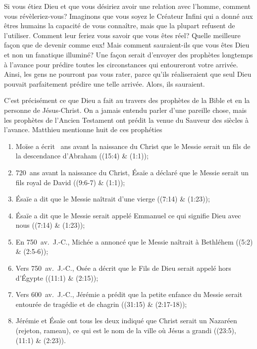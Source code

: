 

Si vous étiez Dieu et que vous désiriez avoir une relation avec l'homme, comment vous révèleriez-vous? Imaginons que vous soyez le Créateur Infini qui a donné aux êtres humains la capacité de vous connaître, mais que la plupart refusent de l'utiliser. Comment leur feriez vous savoir que vous êtes réel? Quelle meilleure façon que de devenir comme eux! Mais comment sauraient-ils que vous êtes Dieu et non un fanatique illuminé? Une façon serait d'envoyer des prophètes longtemps à l'avance pour prédire toutes les circonstances qui entoureront votre arrivée. Ainsi, les gens ne pourront pas vous rater, parce qu'ils réaliseraient que seul Dieu pouvait parfaitement prédire une telle arrivée. Alors, ils sauraient.

C'est précisément ce que Dieu a fait au travers des prophètes de la Bible et en la personne de Jésus-Christ. On a jamais entendu parler d'une pareille chose, mais les prophètes de l'Ancien Testament ont prédit la venue du Sauveur des siècles à l'avance. Matthieu mentionne huit de ces prophéties\frcolon{}

\begin{enumerate}
        \item Moïse a écrit ~ans avant la naissance du Christ que le Messie serait un fils de la descendance d'Abraham ((15:4) \& (1:1));
        \item 720~ans avant la naissance du Christ, Ésaïe a déclaré que le Messie serait un fils royal de David ((9:6-7) \& (1:1));
        \item Ésaïe a dit que le Messie naîtrait d'une vierge ((7:14) \& (1:23));
        \item Ésaïe a dit que le Messie serait appelé Emmanuel ce qui signifie \Og Dieu avec nous \Fg{} ((7:14) \& (1:23));
        \item En 750~av.~J.-C., Michée a annoncé que le Messie naîtrait à Bethléhem ((5:2) \& (2:5-6));
        \item Vers 750~av.~J.-C., Osée a décrit que le Fils de Dieu serait appelé hors d'Égypte ((11:1) \& (2:15));
        \item Vers 600~av.~J.-C., Jérémie a prédit que la petite enfance du Messie serait entourée de tragédie et de chagrin ((31:15) \& (2:17-18));
        \item Jérémie et Ésaïe ont tous les deux indiqué que Christ serait un Nazaréen (rejeton, rameau), ce qui est le nom de la ville où Jésus a grandi ((23:5), (11:1) \& (2:23)).
\end{enumerate}

